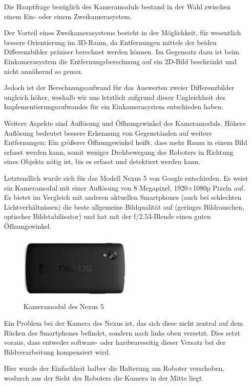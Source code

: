 Die Hauptfrage bezüglich des Kameramoduls bestand in der Wahl zwischen einem Ein- oder einem Zweikamerasystem.

Der Vorteil eines Zweikamerasystems besteht in der Möglichkeit, für wesentlich bessere Orientierung im 3D-Raum, da Entfernungen mittels der beiden Differenzbilder präziser berechnet werden können.
Im Gegensatz dazu ist beim Einkamerasystem die Entfernungsberechnung auf ein 2D-Bild beschränkt und nicht annähernd so genau.

Jedoch ist der Berechnungsaufwand für das Auswerten zweier Differenzbilder ungleich höher, weshalb wir uns letztlich aufgrund dieser Ungleichheit des Implementierungsaufwandes für ein Einkamerasystem entschieden haben.

Weitere Aspekte sind Auflösung und Öffnungswinkel des Kameramoduls.
Höhere Auflösung bedeutet bessere Erkennung von Gegenständen auf weitere Entfernungen; Ein größerer Öffnungswinkel heißt, dass mehr Raum in einem Bild erfasst werden kann, somit weniger Drehbewegung des Roboters in Richtung eines Objekts nötig ist, bis es erfasst und detektiert werden kann.

Letztendlich wurde sich für das Modell Nexus 5 von Google entschieden. Es weist ein Kameramodul mit einer Auflösung von 8 Megapixel, 1920$\times$1080p Pixeln auf. Es bietet im Vergleich mit anderen aktuellen Smartphones (auch bei schlechten Lichtverhältnissen) die beste allgemeine Bildqualität auf (geringes Bildrauschen, optischer Bildstabilisator) und hat mit der f/2.53-Blende einen guten Öffnungswinkel.

\begin{figure}[h]
\centering
\includegraphics[width=0.5\textwidth]{Bilder/Robot/nexus_backside}
\caption{Kameramodul des Nexus 5}
\label{fig:camera}
\end{figure}

Ein Problem bei der Kamera des Nexus ist, das sich diese nicht zentral auf dem Rücken des Smartphones befindet, sondern nach links oben versetzt. Dies setzt voraus, dass entweder software- oder hardwareseitig dieser Versatz bei der Bildverarbeitung kompensiert wird.

Hier wurde der Einfachheit halber die Halterung am Roboter verschoben, wodurch aus der Sicht des Roboters die Kamera in der Mitte liegt.
